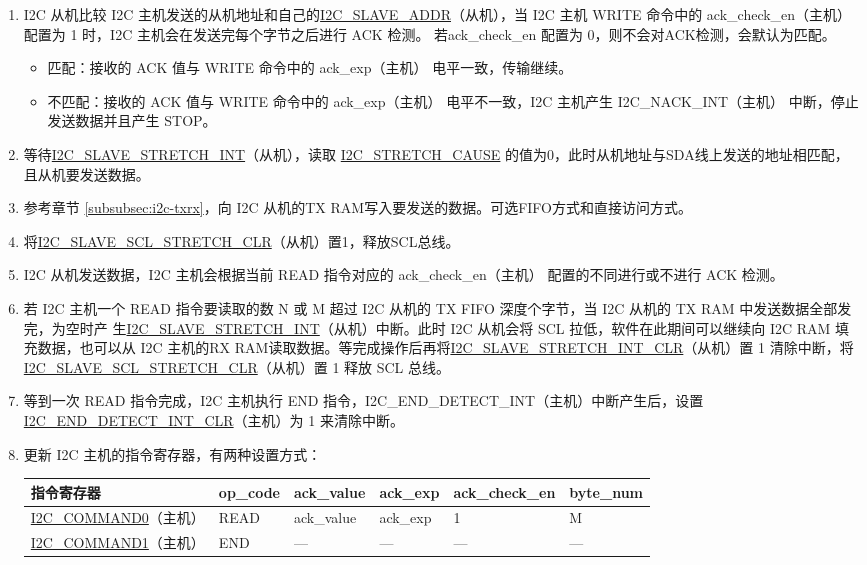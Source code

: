 \documentclass[main\_\_CN.tex]{subfiles}
\begin{document}
\begin{enumerate}
\item I2C 从机比较 I2C 主机发送的从机地址和自己的\hyperref[fielddesc:I2CSLAVEADDR]{I2C\_SLAVE\_ADDR}（从机），当 I2C 主机 WRITE 命令中的 ack\_check\_en（主机） 配置为 1 时，I2C 主机会在发送完每个字节之后进行 ACK 检测。 若ack\_check\_en 配置为 0，则不会对ACK检测，会默认为匹配。
\begin{itemize}
\item 匹配：接收的 ACK 值与 WRITE 命令中的 ack\_exp（主机） 电平一致，传输继续。
\item 不匹配：接收的 ACK 值与 WRITE 命令中的 ack\_exp（主机） 电平不一致，I2C 主机产生 I2C\_NACK\_INT（主机） 中断，停止发送数据并且产生 STOP。
\end{itemize}

\item 等待\hyperref[int:i2c-slave-stretch]{I2C\_SLAVE\_STRETCH\_INT}（从机），读取 \hyperref[fielddesc:I2CSTRETCHCAUSE]{I2C\_STRETCH\_CAUSE} 的值为0，此时从机地址与SDA线上发送的地址相匹配，且从机要发送数据。

\item 参考章节 \ref{subsubsec:i2c-txrx}，向 I2C 从机的TX RAM写入要发送的数据。可选FIFO方式和直接访问方式。
\item 将\hyperref[fielddesc:I2CSLAVESCLSTRETCHCLR]{I2C\_SLAVE\_SCL\_STRETCH\_CLR}（从机）置1，释放SCL总线。

\item I2C 从机发送数据，I2C 主机会根据当前 READ 指令对应的 ack\_check\_en（主机） 配置的不同进行或不进行 ACK 检测。
\item 若 I2C 主机一个 READ 指令要读取的数 N 或 M 超过 I2C 从机的 TX FIFO 深度个字节，当 I2C 从机的 TX RAM 中发送数据全部发完，为空时产 生\hyperref[int:i2c-slave-stretch]{I2C\_SLAVE\_STRETCH\_INT}（从机）中断。此时 I2C 从机会将 SCL 拉低，软件在此期间可以继续向 I2C RAM 填充数据，也可以从 I2C 主机的RX RAM读取数据。等完成操作后再将\hyperref[fielddesc:I2CSLAVESTRETCHINTCLR]{I2C\_SLAVE\_STRETCH\_INT\_CLR}（从机）置 1 清除中断，将 \hyperref[fielddesc:I2CSLAVESCLSTRETCHCLR]{I2C\_SLAVE\_SCL\_STRETCH\_CLR}（从机）置 1 释放 SCL 总线。

\item 等到一次 READ 指令完成，I2C 主机执行 END 指令，I2C\_END\_DETECT\_INT（主机）中断产生后，设置 \hyperref[fielddesc:I2CENDDETECTINTCLR]{I2C\_END\_DETECT\_INT\_CLR}（主机）为 1 来清除中断。

\clearpage
\item 更新 I2C 主机的指令寄存器，有两种设置方式：

\begin{longtable}{ | p{4cm} | p{2cm} | p{2cm} | p{2cm} |p{2cm} | p{2cm} |}
\hline\rowcolor{lightgray}
指令寄存器& op\_code & ack\_value&ack\_exp&ack\_check\_en&byte\_num  \\ \hline
\hyperref[fielddesc:I2CCOMMAND0]{I2C\_COMMAND0}（主机）& READ& ack\_value&ack\_exp&1&M  \\ \hline
\hyperref[fielddesc:I2CCOMMAND1]{I2C\_COMMAND1}（主机）& END& ---&---&---&---  \\ \hline
\end{longtable} 


\end{enumerate}
\end{document}
